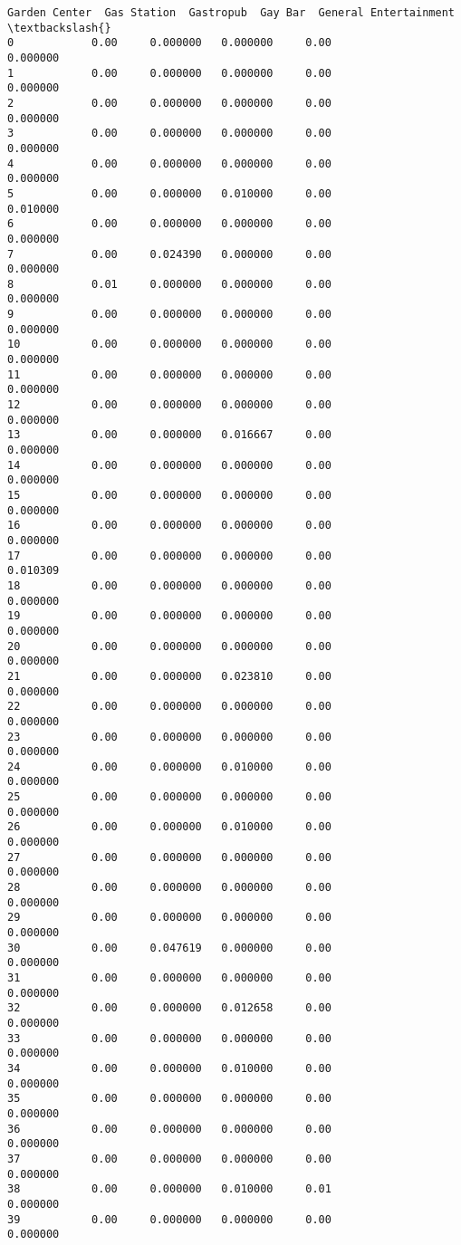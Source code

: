 \documentclass[11pt]{article}
\begin{document}
\begin{tcolorbox}[breakable, size=fbox, boxrule=.5pt, pad at break*=1mm, opacityfill=0]
\begin{Verbatim}[commandchars=\\\{\}]
    Garden Center  Gas Station  Gastropub  Gay Bar  General Entertainment  \textbackslash{}
0            0.00     0.000000   0.000000     0.00               0.000000
1            0.00     0.000000   0.000000     0.00               0.000000
2            0.00     0.000000   0.000000     0.00               0.000000
3            0.00     0.000000   0.000000     0.00               0.000000
4            0.00     0.000000   0.000000     0.00               0.000000
5            0.00     0.000000   0.010000     0.00               0.010000
6            0.00     0.000000   0.000000     0.00               0.000000
7            0.00     0.024390   0.000000     0.00               0.000000
8            0.01     0.000000   0.000000     0.00               0.000000
9            0.00     0.000000   0.000000     0.00               0.000000
10           0.00     0.000000   0.000000     0.00               0.000000
11           0.00     0.000000   0.000000     0.00               0.000000
12           0.00     0.000000   0.000000     0.00               0.000000
13           0.00     0.000000   0.016667     0.00               0.000000
14           0.00     0.000000   0.000000     0.00               0.000000
15           0.00     0.000000   0.000000     0.00               0.000000
16           0.00     0.000000   0.000000     0.00               0.000000
17           0.00     0.000000   0.000000     0.00               0.010309
18           0.00     0.000000   0.000000     0.00               0.000000
19           0.00     0.000000   0.000000     0.00               0.000000
20           0.00     0.000000   0.000000     0.00               0.000000
21           0.00     0.000000   0.023810     0.00               0.000000
22           0.00     0.000000   0.000000     0.00               0.000000
23           0.00     0.000000   0.000000     0.00               0.000000
24           0.00     0.000000   0.010000     0.00               0.000000
25           0.00     0.000000   0.000000     0.00               0.000000
26           0.00     0.000000   0.010000     0.00               0.000000
27           0.00     0.000000   0.000000     0.00               0.000000
28           0.00     0.000000   0.000000     0.00               0.000000
29           0.00     0.000000   0.000000     0.00               0.000000
30           0.00     0.047619   0.000000     0.00               0.000000
31           0.00     0.000000   0.000000     0.00               0.000000
32           0.00     0.000000   0.012658     0.00               0.000000
33           0.00     0.000000   0.000000     0.00               0.000000
34           0.00     0.000000   0.010000     0.00               0.000000
35           0.00     0.000000   0.000000     0.00               0.000000
36           0.00     0.000000   0.000000     0.00               0.000000
37           0.00     0.000000   0.000000     0.00               0.000000
38           0.00     0.000000   0.010000     0.01               0.000000
39           0.00     0.000000   0.000000     0.00               0.000000


\end{Verbatim}
\end{tcolorbox}
\end{document}
